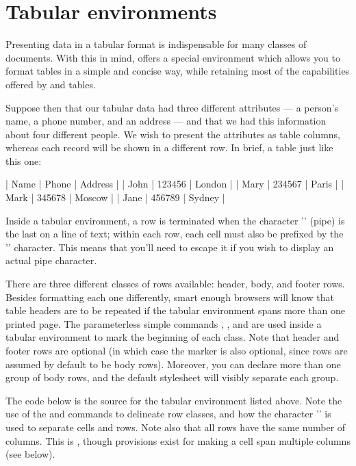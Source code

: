 \section{Tabular environments}

Presenting data in a tabular format is indispensable for many classes of documents.
With this in mind, \lambtex offers a special  environment which
allows you to format tables in a simple and concise way, while retaining most of the
capabilities offered by  and  tables.

Suppose then that our tabular data had three different attributes --- a person's
name, a phone number, and an address --- and that we had this information about four
different people.  We wish to present the attributes as table columns, whereas each
record will be shown in a different row.  In brief, a table just like this one:

\begin{tabular}
\head
| Name      | Phone     | Address   |
\body
| John      | 123456    | London    |
| Mary      | 234567    | Paris     |
| Mark      | 345678    | Moscow    |
| Jane      | 456789    | Sydney    |
\end{tabular}

Inside a tabular environment, a row is terminated when the character '\mono{\|}' (pipe)
is the last on a line of text; within each row, each cell must also be prefixed by the
'\mono{\|}' character.  This means that you'll need to escape it if you wish to display
an actual pipe character.

There are three different classes of rows available: header, body, and footer rows.
Besides formatting each one differently, smart enough browsers will know that table
headers are to be repeated if the tabular environment spans more than one printed page.
The parameterless simple commands \mono{\\head}, \mono{\\body}, and \mono{\\foot}
are used inside a tabular environment to mark the beginning of each class.  Note that
header and footer rows are optional (in which case the \mono{\\body} marker is also
optional, since rows are assumed by default to be body rows).  Moreover, you can
declare more than one group of body rows, and the default  stylesheet will
visibly separate each group.

The code below is the source for the tabular environment listed above.  Note the use
of the \mono{\\head} and \mono{\\body} commands to delineate row classes, and how the
character '\mono{\|}' is used to separate cells and rows.  Note also that all rows
have the same number of columns.  This is , though provisions exist
for making a cell span multiple columns (see below).

